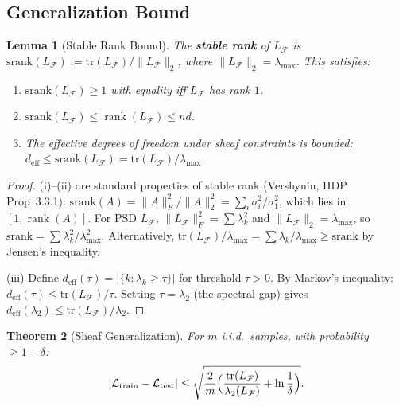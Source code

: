 \documentclass[11pt,a4paper]{article}
\theoremstyle{plain}
\newtheorem{theorem}{Theorem}[section]
\newtheorem{lemma}[theorem]{Lemma}
\theoremstyle{definition}
\theoremstyle{remark}
\newcommand{\cF}{\mathcal{F}}
\newcommand{\cL}{\mathcal{L}}
\newcommand{\tr}{\mathrm{tr}}
\DeclareMathOperator{\rank}{rank}
\begin{document}
\subsection{Generalization Bound}

\begin{lemma}[Stable Rank Bound]\label{lem:stable-rank}
The \textbf{stable rank} of $L_\cF$ is $\mathrm{srank}(L_\cF) := \tr(L_\cF)/\|L_\cF\|_2$, where $\|L_\cF\|_2 = \lambda_{\max}$. This satisfies:
\begin{enumerate}[label=(\roman*),nosep]
\item $\mathrm{srank}(L_\cF) \geq 1$ with equality iff $L_\cF$ has rank $1$.
\item $\mathrm{srank}(L_\cF) \leq \rank(L_\cF) \leq nd$.
\item The effective degrees of freedom under sheaf constraints is bounded: $d_{\mathrm{eff}} \leq \mathrm{srank}(L_\cF) = \tr(L_\cF)/\lambda_{\max}$.
\end{enumerate}
\end{lemma}

\begin{proof}
(i)--(ii) are standard properties of stable rank (Vershynin, HDP Prop~3.3.1): $\mathrm{srank}(A) = \|A\|_F^2/\|A\|_2^2 = \sum_i \sigma_i^2/\sigma_1^2$, which lies in $[1, \rank(A)]$. For PSD $L_\cF$, $\|L_\cF\|_F^2 = \sum \lambda_k^2$ and $\|L_\cF\|_2 = \lambda_{\max}$, so $\mathrm{srank} = \sum \lambda_k^2/\lambda_{\max}^2$. Alternatively, $\tr(L_\cF)/\lambda_{\max} = \sum \lambda_k / \lambda_{\max} \geq \mathrm{srank}$ by Jensen's inequality.

(iii) Define $d_{\mathrm{eff}}(\tau) = |\{k : \lambda_k \geq \tau\}|$ for threshold $\tau > 0$. By Markov's inequality: $d_{\mathrm{eff}}(\tau) \leq \tr(L_\cF)/\tau$. Setting $\tau = \lambda_2$ (the spectral gap) gives $d_{\mathrm{eff}}(\lambda_2) \leq \tr(L_\cF)/\lambda_2$.
\end{proof}

\begin{theorem}[Sheaf Generalization]\label{thm:generalization}
For $m$ i.i.d.\ samples, with probability $\geq 1 - \delta$:
\[
|\cL_{\mathrm{train}} - \cL_{\mathrm{test}}| \leq \sqrt{\frac{2}{m}\Bigl(\frac{\tr(L_\cF)}{\lambda_2(L_\cF)} + \ln\frac{1}{\delta}\Bigr)}.
\]
\end{theorem}
\end{document}
